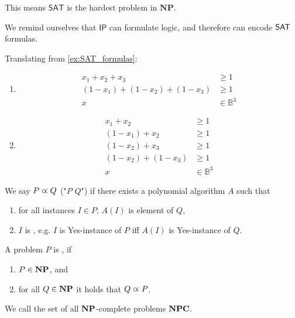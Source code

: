 
This means $\mathsf{SAT}$ is the hardest problem in $\mathbf{NP}$.

We remind ourselves that $\mathsf{IP}$ can formulate logic, and therefore can encode
$\mathsf{SAT}$ formulas.
\begin{example}
    Translating from \autoref{ex:SAT_formulas}:
    \begin{enumerate}
        \item
              \begin{align*}
                  x_1 + x_2 + x_3             & \geq 1           \\
                  (1-x_1) + (1-x_2) + (1-x_3) & \geq 1           \\
                  x                           & \in \mathbb{B}^3
              \end{align*}
        \item
              \begin{align*}
                  x_1 + x_2         & \geq 1           \\
                  (1-x_1) + x_2     & \geq 1           \\
                  (1-x_2) + x_3     & \geq 1           \\
                  (1-x_2) + (1-x_3) & \geq 1           \\
                  x                 & \in \mathbb{B}^3
              \end{align*}
    \end{enumerate}
\end{example}
\begin{definition}[Reduction]
    We say $P \varpropto Q$ ("$P$  $Q$") if there exists a polynomial algorithm $A$
    such that
    \begin{enumerate}
        \item for all instances $I \in P$, $A(I)$ is element of $Q$,
        \item $I$ is , e.g. $I$ is Yes-instance of $P$ iff $A(I)$ is Yes-instance of $Q$.
    \end{enumerate}
\end{definition}
\begin{definition}[$\NP$-complete]
    \label{def:NPC}
    A problem $P$ is , if
    \begin{enumerate}
        \item $P \in \mathbf{NP}$, and
        \item for all $Q \in \mathbf{NP}$ it holds that $Q \varpropto P$.
    \end{enumerate}
    We call the set of all $\NP$-complete problems $\mathbf{NPC}$.
\end{definition}
